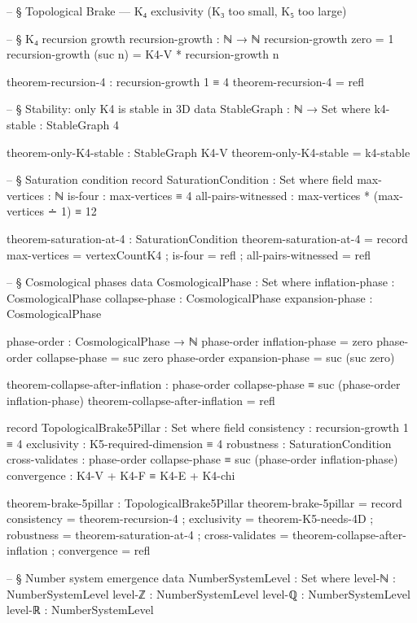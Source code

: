 \documentclass[11pt,a4paper]{book}
\begin{document}
\begin{code}
-- § Topological Brake — K₄ exclusivity (K₃ too small, K₅ too large)

-- § K₄ recursion growth
recursion-growth : ℕ → ℕ
recursion-growth zero = 1
recursion-growth (suc n) = K4-V * recursion-growth n

theorem-recursion-4 : recursion-growth 1 ≡ 4
theorem-recursion-4 = refl

-- § Stability: only K4 is stable in 3D
data StableGraph : ℕ → Set where
  k4-stable : StableGraph 4

theorem-only-K4-stable : StableGraph K4-V
theorem-only-K4-stable = k4-stable

-- § Saturation condition
record SaturationCondition : Set where
  field
    max-vertices : ℕ
    is-four : max-vertices ≡ 4
    all-pairs-witnessed : max-vertices * (max-vertices ∸ 1) ≡ 12

theorem-saturation-at-4 : SaturationCondition
theorem-saturation-at-4 = record
  { max-vertices = vertexCountK4
  ; is-four = refl
  ; all-pairs-witnessed = refl }

-- § Cosmological phases
data CosmologicalPhase : Set where
  inflation-phase : CosmologicalPhase
  collapse-phase : CosmologicalPhase
  expansion-phase : CosmologicalPhase

phase-order : CosmologicalPhase → ℕ
phase-order inflation-phase = zero
phase-order collapse-phase = suc zero
phase-order expansion-phase = suc (suc zero)

theorem-collapse-after-inflation : phase-order collapse-phase ≡ suc (phase-order inflation-phase)
theorem-collapse-after-inflation = refl

record TopologicalBrake5Pillar : Set where
  field
    consistency : recursion-growth 1 ≡ 4
    exclusivity : K5-required-dimension ≡ 4
    robustness : SaturationCondition
    cross-validates : phase-order collapse-phase ≡ suc (phase-order inflation-phase)
    convergence : K4-V + K4-F ≡ K4-E + K4-chi

theorem-brake-5pillar : TopologicalBrake5Pillar
theorem-brake-5pillar = record
  { consistency = theorem-recursion-4
  ; exclusivity = theorem-K5-needs-4D
  ; robustness = theorem-saturation-at-4
  ; cross-validates = theorem-collapse-after-inflation
  ; convergence = refl }

-- § Number system emergence
data NumberSystemLevel : Set where
  level-ℕ : NumberSystemLevel
  level-ℤ : NumberSystemLevel
  level-ℚ : NumberSystemLevel
  level-ℝ : NumberSystemLevel


\end{code}
\end{document}
